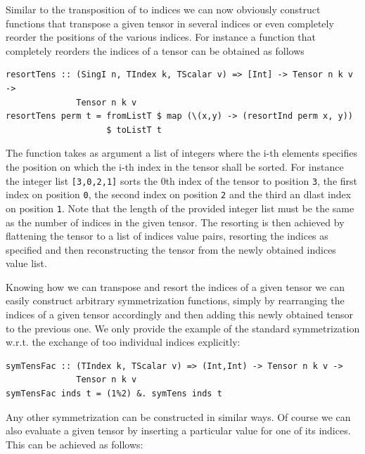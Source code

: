 \documentclass[a4paper,12pt, DIV=14, BCOR=5mm, twoside, headsepline]{scrbook}
\begin{document}
Similar to the transposition of to indices we can now obviously construct functions that transpose a given tensor in several indices or even completely reorder the positions of the various indices.  For instance a function that completely reorders the indices of a tensor can be obtained as follows

\begin{samepage} 
\begin{verbatim}
resortTens :: (SingI n, TIndex k, TScalar v) => [Int] -> Tensor n k v ->
              Tensor n k v 
resortTens perm t = fromListT $ map (\(x,y) -> (resortInd perm x, y))
                    $ toListT t 
\end{verbatim} 
\end{samepage}

The function takes as argument a list of integers where the i-th elements specifies the position on which the i-th index in the tensor shall be sorted. For instance the integer list \texttt{[3,0,2,1]} sorts the 0th index of the tensor to position \texttt{3}, the first index on position \texttt{0}, the second index on position \texttt{2} and the third an dlast index on position \texttt{1}. Note that the length of the provided integer list must be the same as the number of indices in the given tensor.  The resorting is then achieved by flattening the tensor to a list of indices value pairs, resorting the indices as specified and then reconstructing the tensor from the newly obtained indices value list. 

Knowing how we can transpose and resort the indices of a given tensor we can easily construct arbitrary symmetrization functions, simply by rearranging the indices of a given tensor accordingly and then adding this newly obtained tensor to the previous one. We only provide the example of the standard symmetrization w.r.t. the exchange of too individual indices explicitly:

\begin{samepage} 
\begin{verbatim}
symTensFac :: (TIndex k, TScalar v) => (Int,Int) -> Tensor n k v ->
              Tensor n k v 
symTensFac inds t = (1%2) &. symTens inds t
\end{verbatim} 
\end{samepage}

Any other symmetrization can be constructed in similar ways.
Of course we can also evaluate a given tensor by inserting a particular value for one of its indices. This can be achieved as follows:
\end{document}

